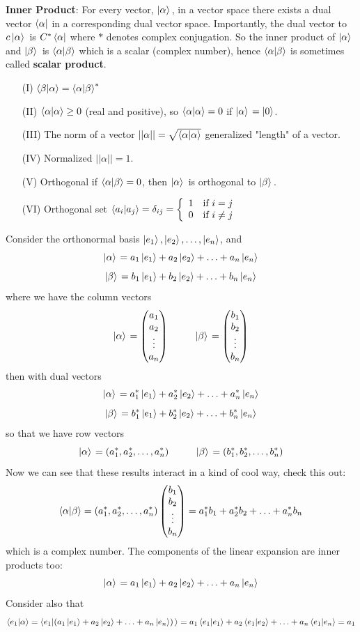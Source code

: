 \documentclass[english, 11pt]{article}
\begin{document}
        {\bf Inner Product}: For every vector, $\left| \alpha \rangle \right.$, in a vector space there exists a dual vector $\left\langle\alpha\right|$ in a corresponding dual vector space. Importantly, the dual vector to $c\left| \alpha \rangle \right.$ is $C^*\left\langle\alpha\right|$ where $*$ denotes complex conjugation. So the inner product of $\left| \alpha \rangle \right.$ and $\left| \beta \rangle \right.$ is $\braket{\alpha}{\beta}$ which is a scalar (complex number), hence $\braket{\alpha}{\beta}$ is sometimes called {\bf scalar product}.

        \begin{itemize}
          \item[(I)] $\braket{\beta}{\alpha} = \braket{\alpha}{\beta}^*$
          \item[(II)] $\braket{\alpha}{\alpha} \geq 0$ (real and positive), so $\braket{\alpha}{\alpha} = 0$ if $\left| \alpha \rangle \right. = \left|0\right\rangle$.
          \item[(III)] The norm of a vector $||\alpha|| = \sqrt{\braket{\alpha}{\alpha}}$ generalized "length" of a vector.
          \item[(IV)] Normalized $||\alpha|| = 1$.
          \item[(V)] Orthogonal if $\braket{\alpha}{\beta} = 0$, then $\left| \alpha \rangle \right.$ is orthogonal to $\left| \beta \rangle \right.$.
          \item[(VI)] Orthogonal set $\braket{a_i}{a_j} = \delta_{ij} = \piecewise{1}{if $i = j$}{0}{if $i \not = j$}$
        \end{itemize}

        Consider the orthonormal basis $\left|e_1\right\rangle, \left|e_2\right\rangle, \ldots, \left|e_n\right\rangle$, and
        \[ \left| \alpha \rangle \right. = a_1 \left|e_1\right\rangle + a_2 \left|e_2\right\rangle + \ldots + a_n \left|e_n\right\rangle \]
        \[ \left| \beta \rangle \right. = b_1 \left|e_1\right\rangle + b_2 \left|e_2\right\rangle + \ldots + b_n \left|e_n\right\rangle \]
        where we have the column vectors
        \[ \left| \alpha \rangle \right. = \left(\begin{matrix}a_1 \\ a_2 \\ \vdots \\ a_n\end{matrix}\right) \ \ \ \ \ \ \ \ \left| \beta \rangle \right. = \left(\begin{matrix}b_1 \\ b_2 \\ \vdots \\ b_n\end{matrix}\right) \]
        then with dual vectors
        \[ \left| \alpha \rangle \right.  = a_1^*\left|e_1\right\rangle + a_2^*\left|e_2\right\rangle + \ldots + a_n^*\left|e_n\right\rangle \]
        \[ \left| \beta \rangle \right.  = b_1^*\left|e_1\right\rangle + b_2^*\left|e_2\right\rangle + \ldots + b_n^*\left|e_n\right\rangle \]
        so that we have row vectors
        \[ \ka = (a_1^*, a_2^*, \ldots, a_n^*)  \ \ \ \ \ \ \ \ \kb = (b_1^*, b_2^*, \ldots,b_n^*) \]
        Now we can see that these results interact in a kind of cool way, check this out:
        \[ \braket{\alpha}{\beta} = (a_1^*, a_2^*, \ldots, a_n^*) \mtx{b_1 \\ b_2 \\ \vdots \\ b_n} = a_1^*b_1 + a_2^*b_2 + \ldots + a_n^* b_n \]
        which is a complex number. The components of the linear expansion are inner products too:
        \[ \left| \alpha \rangle \right. = a_1\left|e_1\right\rangle + a_2\left|e_2\right\rangle + \ldots + a_n\left|e_n\right\rangle \]
        Consider also that
        \[ \braket{e_1}{\alpha} = \braket{e_1}{\left(a_1\ket{e_1} + a_2\ket{e_2} + \ldots + a_n\ket{e_n}\right)} = a_1\braket{e_1}{e_1} + a_2\braket{e_1}{e_2} + \ldots + a_n\braket{e_1}{e_n} = a_1\]
\end{document}
